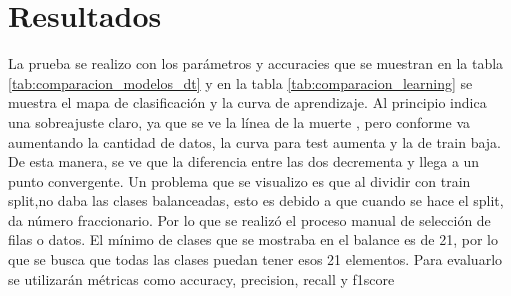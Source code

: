 \documentclass[conference]{IEEEtran}
\begin{document}
\section{Resultados}
La prueba se realizo con los parámetros y accuracies que se muestran en la tabla \ref{tab:comparacion_modelos_dt} y en la tabla \ref{tab:comparacion_learning} se muestra el mapa de clasificación y la curva de aprendizaje. Al principio indica una sobreajuste claro, ya que se ve la línea de la muerte , pero conforme va aumentando la cantidad de datos, la curva para test aumenta y la de train baja. De esta manera, se ve que la diferencia entre las dos decrementa y llega a un punto convergente.  Un problema que se visualizo es que al dividir con train split,no daba las clases balanceadas, esto es debido a que cuando se hace el split, da número fraccionario. Por lo que se realizó el proceso manual de selección de filas o datos. El mínimo de clases que se mostraba en el balance es de 21, por lo que se busca que todas las clases puedan tener esos 21 elementos.
Para evaluarlo se utilizarán métricas como accuracy, precision, recall y f1\-score
\end{document}
